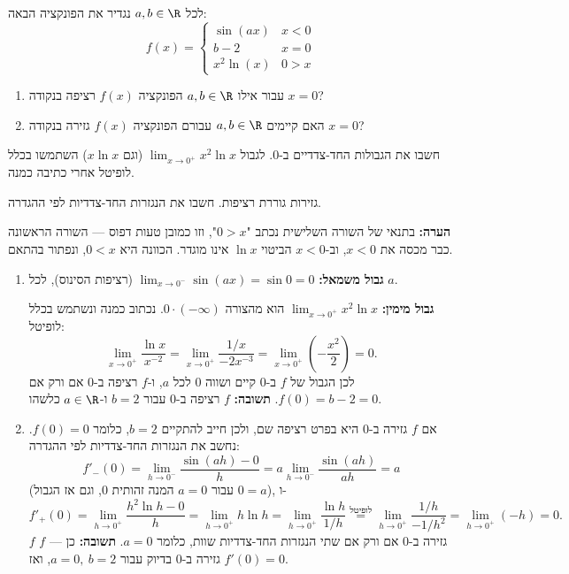 
\begin{question}
לכל $a,b\in\R$ נגדיר את הפונקציה הבאה:
\[ f(x)=\begin{cases} \sin(ax) & x<0\\ b-2 & x=0\\ x^2\ln(x) & 0>x\end{cases} \]
\begin{enumerate}
  \item עבור אילו $a,b\in\R$ הפונקציה $f(x)$ רציפה בנקודה $x=0$?
  \item האם קיימים $a,b\in\R$ עבורם הפונקציה $f(x)$ גזירה בנקודה $x=0$?
\end{enumerate}
\end{question}

\begin{hint}
חשבו את הגבולות החד-צדדיים ב-$0$. לגבול $\lim_{x\to0^+}x^2\ln x$ (וגם $x\ln x$) השתמשו בכלל לופיטל אחרי כתיבה כמנה.
\end{hint}

\begin{hint}
גזירות גוררת רציפות. חשבו את הנגזרות החד-צדדיות לפי ההגדרה.
\end{hint}

\begin{solution}
\textbf{הערה:} בתנאי של השורה השלישית נכתב "$0>x$", וזו כמובן טעות דפוס — השורה הראשונה כבר מכסה את $x<0$, וב-$x<0$ הביטוי $\ln x$ אינו מוגדר. הכוונה היא $0<x$, ונפתור בהתאם.
\begin{enumerate}
  \item \textbf{גבול משמאל:} $\lim_{x\to0^-}\sin(ax)=\sin0=0$ (רציפות הסינוס), לכל $a$.

  \textbf{גבול מימין:} $\lim_{x\to0^+}x^2\ln x$ הוא מהצורה $0\cdot(-\infty)$. נכתוב כמנה ונשתמש בכלל לופיטל:
  \[ \lim_{x\to0^+}\frac{\ln x}{x^{-2}}=\lim_{x\to0^+}\frac{1/x}{-2x^{-3}}=\lim_{x\to0^+}\left(-\frac{x^2}{2}\right)=0. \]
  לכן הגבול של $f$ ב-$0$ קיים ושווה $0$ לכל $a$, ו-$f$ רציפה ב-$0$ אם ורק אם $f(0)=b-2=0$.
  \textbf{תשובה:} $f$ רציפה ב-$0$ עבור $b=2$ ו-$a\in\R$ כלשהו.
  \item אם $f$ גזירה ב-$0$ היא בפרט רציפה שם, ולכן חייב להתקיים $b=2$, כלומר $f(0)=0$. נחשב את הנגזרות החד-צדדיות לפי ההגדרה:
  \[ f'_-(0)=\lim_{h\to0^-}\frac{\sin(ah)-0}{h}=a\lim_{h\to0^-}\frac{\sin(ah)}{ah}=a \]
  (עבור $a=0$ המנה זהותית $0$, וגם אז הגבול $0=a$), ו-
  \[ f'_+(0)=\lim_{h\to0^+}\frac{h^2\ln h-0}{h}=\lim_{h\to0^+}h\ln h=\lim_{h\to0^+}\frac{\ln h}{1/h}\overset{\text{לופיטל}}{=}\lim_{h\to0^+}\frac{1/h}{-1/h^2}=\lim_{h\to0^+}(-h)=0. \]
  $f$ גזירה ב-$0$ אם ורק אם שתי הנגזרות החד-צדדיות שוות, כלומר $a=0$.
  \textbf{תשובה:} כן — $f$ גזירה ב-$0$ בדיוק עבור $a=0,\ b=2$, ואז $f'(0)=0$.
\end{enumerate}
\end{solution}
